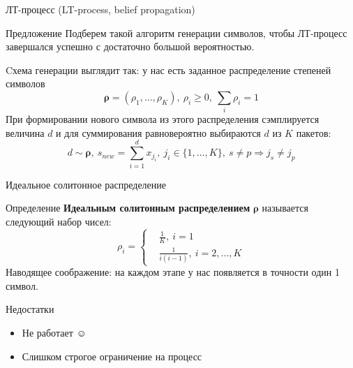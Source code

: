 \documentclass{beamer}
\begin{document}
\begin{frame}{ЛТ-процесс (LT-process, belief propagation)}

    \begin{block}{Предложение}
        Подберем такой алгоритм генерации символов, чтобы
        ЛТ-процесс завершался успешно с достаточно большой вероятностью.
    \end{block}

    Cхема генерации выглядит так: у нас есть заданное
    распределение степеней символов
    \[
        \boldsymbol{\rho} = (\rho_1,\dots,\rho_K), \:
        \rho_i\ge 0, \:
        \sum_i \rho_i = 1
    \]
    При формировании нового символа из этого распределения сэмплируется
    величина $d$ и для суммирования равновероятно выбираются $d$ из $K$ 
    пакетов:
    \[
        d\sim \boldsymbol{\rho}, \: 
        s_{new} = \sum_{i=1}^d x_{j_i},\:
        j_i\in\{1,\dots,K\},\: s\ne p\Rightarrow j_{s}\ne j_{p}
    \]
\end{frame}

\begin{frame}{Идеальное солитонное распределение}

    \begin{block}{Определение}
        \textbf{Идеальным солитонным распределением} $\boldsymbol{\rho}$
        называется следующий набор чисел:
        \[
            \rho_i=
            \left\{
            \begin{aligned}
                &\frac{1}{K},\: i=1\\
                &\frac{1}{i(i-1)},\: i=2,\dots,K
            \end{aligned}
            \right.
        \]
        Наводящее соображение: на каждом этапе у нас появляется в точности
        один 1 символ.
    \end{block}

    \begin{alertblock}{Недостатки}
        \begin{itemize}
            \item Не работает $\smiley$
            \item Слишком строгое ограничение на процесс
        \end{itemize}
    \end{alertblock}

\end{frame}
\end{document}
